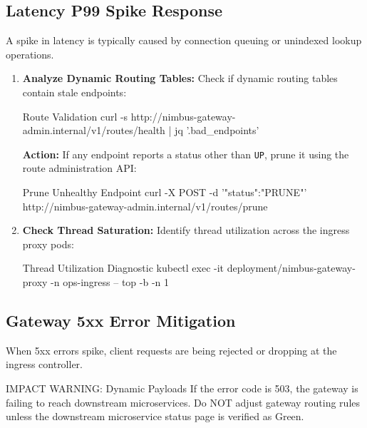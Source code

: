 \subsection{Latency P99 Spike Response}
\label{sub:latency_remediation}
A spike in latency is typically caused by connection queuing or unindexed lookup operations.

\begin{enumerate}
    \item \textbf{Analyze Dynamic Routing Tables:} Check if dynamic routing tables contain stale endpoints:
    \begin{codeblock}{Route Validation}
curl -s http://nimbus-gateway-admin.internal/v1/routes/health | jq '.bad_endpoints'
    \end{codeblock}
    
    \textbf{Action:} If any endpoint reports a status other than \texttt{UP}, prune it using the route administration API:
    \begin{codeblock}{Prune Unhealthy Endpoint}
curl -X POST -d '{"status":"PRUNE"}' http://nimbus-gateway-admin.internal/v1/routes/prune
    \end{codeblock}
    
    \item \textbf{Check Thread Saturation:} Identify thread utilization across the ingress proxy pods:
    \begin{codeblock}{Thread Utilization Diagnostic}
kubectl exec -it deployment/nimbus-gateway-proxy -n ops-ingress -- top -b -n 1
    \end{codeblock}
\end{enumerate}

\subsection{Gateway 5xx Error Mitigation}
\label{sub:gateway_errors}
When 5xx errors spike, client requests are being rejected or dropping at the ingress controller.

\begin{warningbox}{IMPACT WARNING: Dynamic Payloads}
    If the error code is 503, the gateway is failing to reach downstream microservices. Do NOT adjust gateway routing rules unless the downstream microservice status page is verified as Green.
\end{warningbox}

